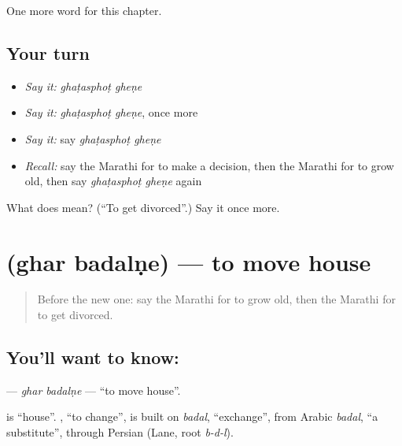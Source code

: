 \begin{grammarlens}[title={What you've built}]
One more word for this chapter.
\end{grammarlens}

\subsection*{Your turn}
\begin{itemize}
\raggedright
  \item \emph{Say it:} \emph{ghaṭasphoṭ gheṇe}
  \item \emph{Say it:} \emph{ghaṭasphoṭ gheṇe}, once more
  \item \emph{Say it:} say \emph{ghaṭasphoṭ gheṇe}
  \item \emph{Recall:} say the Marathi for to make a decision, then the Marathi for to grow old, then say \emph{ghaṭasphoṭ gheṇe} again
\end{itemize}

\begin{tcolorbox}[breakable,colback=teal!4,colframe=teal!35!black,title={Before you move on}]
What does   mean? (\textquotedblleft{}To get divorced\textquotedblright{}.) Say it once more.
\end{tcolorbox}
\section[\texorpdfstring{\mr{घर} \mr{बदलणे} (ghar badalṇe)}{घर बदलणे (ghar badalṇe)}]{  (ghar badalṇe) — to move house}

\label{lesson:MR-C224-ghar-badalne}



\begin{quote}
Before the new one: say the Marathi for to grow old, then the Marathi for to get divorced.
\end{quote}

\subsection*{You'll want to know:  }
\textbf{ } — \emph{ghar badalṇe} — \textquotedblleft{}to move house\textquotedblright{}.

\begin{cousinweb}
\textbf{} is \textquotedblleft{}house\textquotedblright{}. \textbf{}, \textquotedblleft{}to change\textquotedblright{}, is built on \emph{badal}, \textquotedblleft{}exchange\textquotedblright{}, from Arabic \emph{badal}, \textquotedblleft{}a substitute\textquotedblright{}, through Persian (Lane, root \emph{b-d-l}).
\end{cousinweb}

